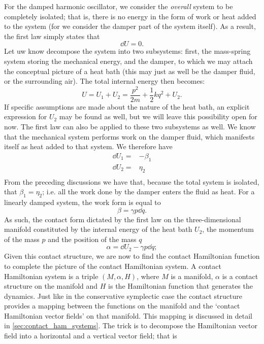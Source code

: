 For the damped harmonic oscillator, we consider the \emph{overall} system to be completely isolated; that is, there is no energy in the form of work or heat added to the system (for we consider the damper part of the system itself). As a result, the first law simply states that
$$ \dd{U} = 0. $$
Let uw know decompose the system into two subsystems: first, the mass-spring system storing the mechanical energy, and the damper, to which we may attach the conceptual picture of a heat bath (this may just as well be the damper fluid, or the surrounding air). The total internal energy then becomes:
$$ U = U_1 + U_2 = \frac{p^2}{2m} + \frac{1}{2}kq^2 + U_2. $$
If specific assumptions are made about the nature of the heat bath, an explicit expression for $U_2$ may be found as well, but we will leave this possibility open for now. The first law can also be applied to these two subsystems as well. We know that the mechanical system performs work on the damper fluid, which manifests itself as heat added to that system. We therefore have
\begin{equation}
    \begin{split}
        \dd{U}_1 =& -\beta_1 \\
        \dd{U}_2 =&  \eta_2 \\
    \end{split}
\end{equation}
From the preceding discussions we have that, because the total system is isolated, that $ \beta_1 = \eta_2 $; i.e. all the work done by the damper enters the fluid as heat. For a linearly damped system, the work form is equal to 
$$ \beta = \gamma p \dd{q}. $$
As such, the contact form dictated by the first law on the three-dimensional manifold constituted by the internal energy of the heat bath $U_2$, the momentum of the mass $p$ and the position of the mass $q$
\begin{equation}
    \alpha = \dd{U}_2 - \gamma p \dd{q};
    \label{eq:dho_contact_form_thermo}
\end{equation}
Given this contact structure, we are now to find the contact Hamiltonian function to complete the picture of the contact Hamiltonian system. A contact Hamiltonian system is a triple $(M, \alpha, H)$, where $M$ is a manifold, $\alpha$ is a contact structure on the manifold and $H$ is the Hamiltonian function that generates the dynamics. Just like in the conservative symplectic case the contact structure provides a mapping between the functions on the manifold and the `contact Hamiltonian vector fields' on that manifold. This mapping is discussed in detail in \cref{sec:contact_ham_systems}. The trick is to decompose the Hamiltonian vector field into a horizontal and a vertical vector field; that is
